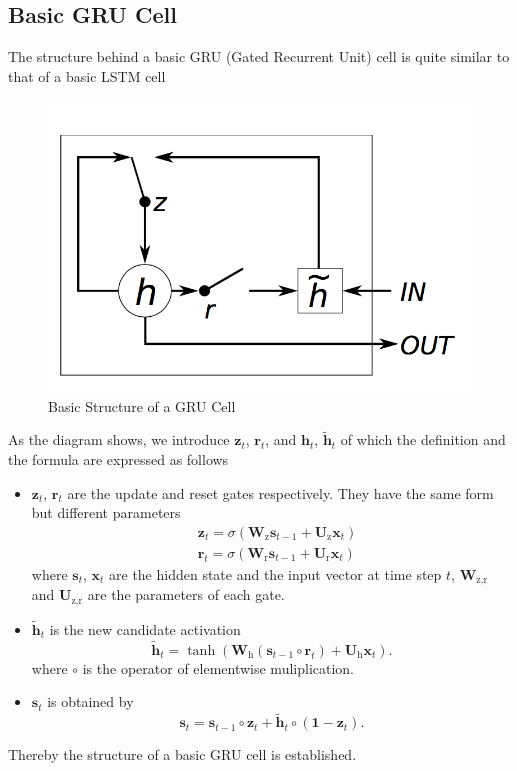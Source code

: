 \documentclass[10pt]{article}
\begin{document}
\subsection{Basic GRU Cell}
The structure behind a basic GRU (Gated Recurrent Unit) cell is quite similar to that of a basic LSTM cell
\begin{figure}[H]
\centering
\includegraphics[scale=.6]{gru.png}
\caption{Basic Structure of a GRU Cell}
\label{gru}
\end{figure}
As the diagram shows, we introduce $\mathbf{z}_t$, $\mathbf{r}_t$, and $\mathbf{h}_t$, $\tilde{\mathbf{h}}_t$ of which the definition and the formula are expressed as follows \cite{chung2014empirical}
\begin{itemize}
\item $\mathbf{z}_t$, $\mathbf{r}_t$ are the update and reset gates respectively. They have the same form but different parameters
\begin{align*}
& \mathbf{z}_t = \sigma\left(\mathbf{W}_{\text{z}}\mathbf{s}_{t-1} + \mathbf{U}_{\text{z}}\mathbf{x}_{t}\right) \\
& \mathbf{r}_t = \sigma\left(\mathbf{W}_{\text{r}}\mathbf{s}_{t-1} + \mathbf{U}_{\text{r}}\mathbf{x}_{t}\right)
\end{align*}
where $\mathbf{s}_t$, $\mathbf{x}_t$ are the hidden state and the input vector at time step $t$, $\mathbf{W}_{\text{z}, \text{r}}$ and $\mathbf{U}_{\text{z}, \text{r}}$ are the parameters of each gate.
\item $\tilde{\mathbf{h}}_t$ is the new candidate activation
$$\tilde{\mathbf{h}}_t = \tanh\left(\mathbf{W}_{\text{h}}\left(\mathbf{s}_{t-1} \circ \mathbf{r}_t\right) + \mathbf{U}_{\text{h}}\mathbf{x}_{t}\right)\text{.}$$
where $\circ$ is the operator of elementwise muliplication.
\item $\mathbf{s}_t$ is obtained by
$$\mathbf{s}_t = \mathbf{s}_{t-1} \circ \mathbf{z}_t + \tilde{\mathbf{h}}_t \circ \left(\boldsymbol{1} - \mathbf{z}_t\right)\text{.}$$
\end{itemize}
Thereby the structure of a basic GRU cell is established.
\clearpage
\end{document}
